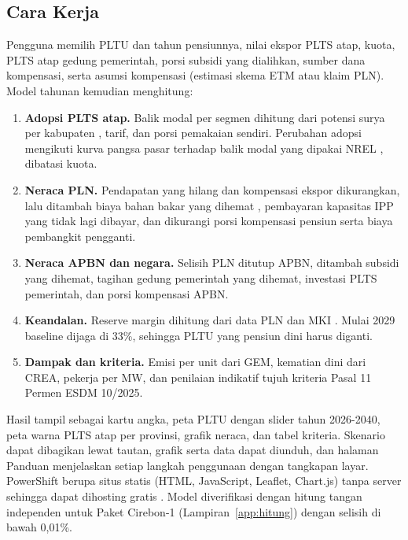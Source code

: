 \subsection{Cara Kerja}

Pengguna memilih PLTU dan tahun pensiunnya, nilai ekspor PLTS atap, kuota, PLTS atap gedung pemerintah, porsi subsidi yang dialihkan, sumber dana kompensasi, serta asumsi kompensasi (estimasi skema ETM atau klaim PLN). Model tahunan kemudian menghitung:
\begin{enumerate}
  \item \textbf{Adopsi PLTS atap.} Balik modal per segmen dihitung dari potensi surya per kabupaten \parencite{D-GSA-PVOUT}, tarif, dan porsi pemakaian sendiri. Perubahan adopsi mengikuti kurva pangsa pasar terhadap balik modal yang dipakai NREL \parencite{P-NREL-SOLARDS}, dibatasi kuota.
  \item \textbf{Neraca PLN.} Pendapatan yang hilang dan kompensasi ekspor dikurangkan, lalu ditambah biaya bahan bakar yang dihemat \parencite{B-KONTAN-DMO-2026}, pembayaran kapasitas IPP yang tidak lagi dibayar, dan dikurangi porsi kompensasi pensiun serta biaya pembangkit pengganti.
  \item \textbf{Neraca APBN dan negara.} Selisih PLN ditutup APBN, ditambah subsidi yang dihemat, tagihan gedung pemerintah yang dihemat, investasi PLTS pemerintah, dan porsi kompensasi APBN.
  \item \textbf{Keandalan.} Reserve margin dihitung dari data PLN dan MKI \parencite{B-MATAHARI-2024,B-PETROMINDO-RESERVE}. Mulai 2029 baseline dijaga di 33\%, sehingga PLTU yang pensiun dini harus diganti.
  \item \textbf{Dampak dan kriteria.} Emisi per unit dari GEM, kematian dini dari CREA, pekerja per MW, dan penilaian indikatif tujuh kriteria Pasal 11 Permen ESDM 10/2025.
\end{enumerate}

Hasil tampil sebagai kartu angka, peta PLTU dengan slider tahun 2026-2040, peta warna PLTS atap per provinsi, grafik neraca, dan tabel kriteria. Skenario dapat dibagikan lewat tautan, grafik serta data dapat diunduh, dan halaman Panduan menjelaskan setiap langkah penggunaan dengan tangkapan layar. PowerShift berupa situs statis (HTML, JavaScript, Leaflet, Chart.js) tanpa server sehingga dapat dihosting gratis \parencite{S-LEAFLET,S-CHARTJS}. Model diverifikasi dengan hitung tangan independen untuk Paket Cirebon-1 (Lampiran~\ref{app:hitung}) dengan selisih di bawah 0,01\%.

